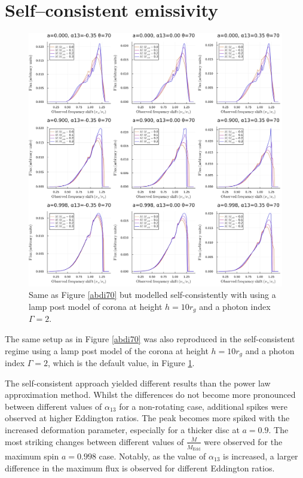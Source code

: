 \documentclass[fleqn,usenatbib,useAMS]{mnras}
\begin{document}
\section{Self--consistent emissivity}

\begin{figure}[h!]
    \centering
    \includegraphics[width=\linewidth]{figures/selfconsistent_abdi70.png}
    \caption{Same as Figure \ref{abdi70} but modelled self-consistently with using a lamp post model of corona at height $h=10 r_{g}$ and a photon index $\Gamma = 2$.}
    \label{selfconsistent_abdi70}
\end{figure}

The same setup as in Figure \ref{abdi70} was also reproduced in the self-consistent regime using a lamp post model of the corona at height $h=10 r_{g}$ and a photon index $\Gamma = 2$, which is the default value, in Figure \ref{selfconsistent_abdi70}. 

The self-consistent approach yielded different results than the power law approximation method. Whilst the differences do not become more pronounced between different values of $\alpha_{13}$ for a non-rotating case, additional spikes were observed at higher Eddington ratios. The peak becomes more spiked with the increased deformation parameter, especially for a thicker disc at $a = 0.9$. The most striking changes between different values of $\frac{\dot{M}}{\dot{M}_\text{Edd}}$ were observed for the maximum spin $a = 0.998$ case.  Notably, as the value of $\alpha_{13}$ is increased, a larger difference in the maximum flux is observed for different Eddington ratios.
\end{document}

